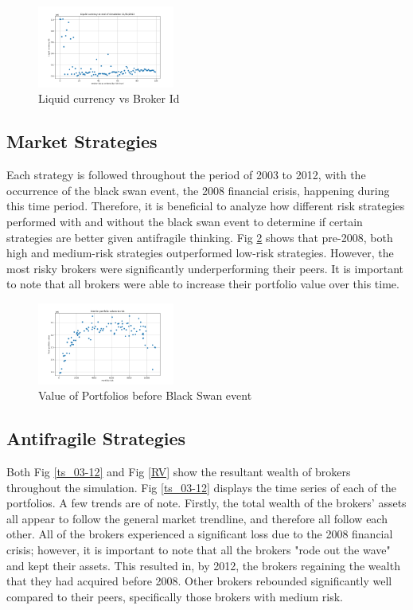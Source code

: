 \documentclass[letterpaper, 10 pt, proceedings]{ieeetran}
\begin{document}
	\begin{figure}[h]
		\centering
		\includegraphics[width=0.4\textwidth]{liquidCurrency.png}
		\caption{Liquid currency vs Broker Id}
		\label{liquidvID}
	\end{figure}
	\FloatBarrier	

	\subsection{Market Strategies}\label{subsec:results_midpoint}
	Each strategy is followed throughout the period of 2003 to 2012, with the occurrence of the black swan event, the 2008 financial crisis, happening during this time period. Therefore, it is beneficial to analyze how different risk strategies performed with and without the black swan event to determine if certain strategies are better given antifragile thinking. Fig \ref{interimRV} shows that pre-2008, both high and medium-risk strategies outperformed low-risk strategies. However, the most risky brokers were significantly underperforming their peers. It is important to note that all brokers were able to increase their portfolio value over this time.

	\begin{figure}[h]
		\centering
		\includegraphics[width=0.4\textwidth]{interimRiskToValue.png}
		\caption{Value of Portfolios before Black Swan event}
		\label{interimRV}
	\end{figure}
	\FloatBarrier

	\subsection{Antifragile Strategies}\label{subsec:results_end}	
	
	Both Fig \ref{ts_03-12} and Fig \ref{RV} show the resultant wealth of brokers throughout the simulation. Fig \ref{ts_03-12} displays the time series of each of the portfolios. A few trends are of note. Firstly, the total wealth of the brokers' assets all appear to follow the general market trendline, and therefore all follow each other. All of the brokers experienced a significant loss due to the 2008 financial crisis; however, it is important to note that all the brokers "rode out the wave" and kept their assets. This resulted in, by 2012, the brokers regaining the wealth that they had acquired before 2008. Other brokers rebounded significantly well compared to their peers, specifically those brokers with medium risk.
\end{document}
